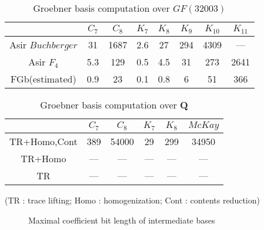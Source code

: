 \documentclass[runningheads]{cl2emult}
\begin{document}
\begin{table}[hbtp]
\begin{center}
\begin{tabular}{|c||c|c|c|c|c|c|c|} \hline
		& $C_7$ & $C_8$ & $K_7$ & $K_8$ & $K_9$ & $K_{10}$ & $K_{11}$ \\ \hline
Asir $Buchberger$	& 31 & 1687  & 2.6  & 27 & 294  & 4309 & --- \\ \hline
Asir $F_4$	& 5.3 & 129 & 0.5  & 4.5 & 31  & 273 & 2641 \\ \hline
FGb(estimated)	& 0.9 & 23 & 0.1 & 0.8 & 6 & 51 & 366 \\ \hline
\end{tabular}
\end{center}
\caption{Groebner basis computation over $GF(32003)$}
\label{gbmod}
\end{table}

\begin{table}[hbtp]
\begin{center}
\begin{tabular}{|c||c|c|c|c|c|} \hline
		& $C_7$ & $C_8$ & $K_7$ & $K_8$ & $McKay$ \\ \hline
TR+Homo,Cont & 389 & 54000 & 29 & 299 & 34950 \\ \hline
TR+Homo & --- & --- & --- & --- & --- \\ \hline
TR & --- & --- & --- & --- & --- \\ \hline
\end{tabular}

(TR : trace lifting; Homo : homogenization; Cont : contents reduction)
\end{center}
\caption{Groebner basis computation over {\bf Q}}
\label{gbq}
\end{table}

\begin{figure}[hbtp]
\begin{center}
\epsfxsize=12cm
\end{center}
\caption{Maximal coefficient bit length of intermediate bases}
\label{f4vsbuch}
\end{figure}
\end{document}
